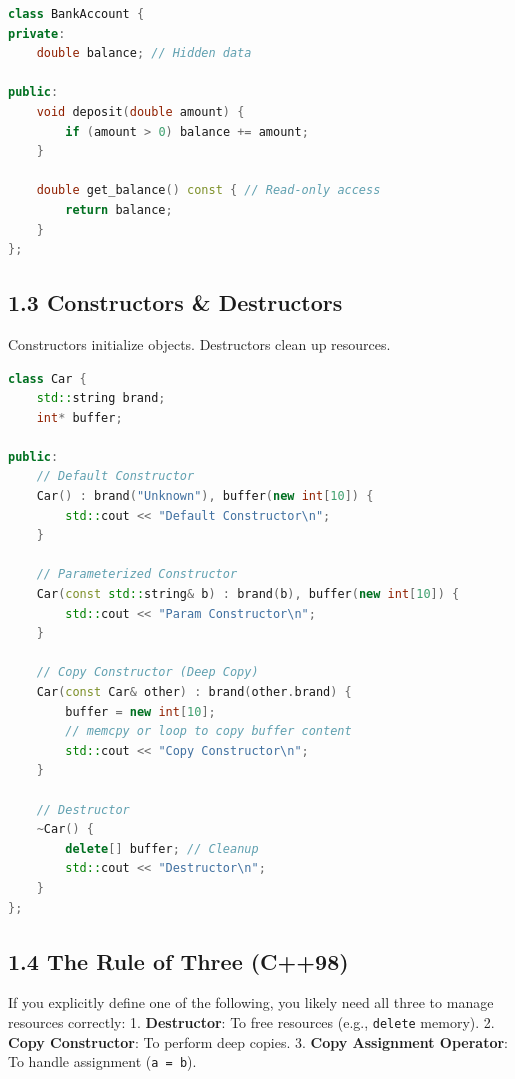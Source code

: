 \begin{lstlisting}[language={C++}]
class BankAccount {
private:
    double balance; // Hidden data

public:
    void deposit(double amount) {
        if (amount > 0) balance += amount;
    }
    
    double get_balance() const { // Read-only access
        return balance;
    }
};
\end{lstlisting}

\hypertarget{constructors-destructors}{%
\subsection{1.3 Constructors \&
Destructors}\label{constructors-destructors}}

Constructors initialize objects. Destructors clean up resources.

\begin{lstlisting}[language={C++}]
class Car {
    std::string brand;
    int* buffer;

public:
    // Default Constructor
    Car() : brand("Unknown"), buffer(new int[10]) {
        std::cout << "Default Constructor\n";
    }

    // Parameterized Constructor
    Car(const std::string& b) : brand(b), buffer(new int[10]) {
        std::cout << "Param Constructor\n";
    }

    // Copy Constructor (Deep Copy)
    Car(const Car& other) : brand(other.brand) {
        buffer = new int[10];
        // memcpy or loop to copy buffer content
        std::cout << "Copy Constructor\n";
    }

    // Destructor
    ~Car() {
        delete[] buffer; // Cleanup
        std::cout << "Destructor\n";
    }
};
\end{lstlisting}

\hypertarget{the-rule-of-three-c98}{%
\subsection{1.4 The Rule of Three (C++98)}\label{the-rule-of-three-c98}}

If you explicitly define one of the following, you likely need all three
to manage resources correctly: 1. \textbf{Destructor}: To free resources
(e.g., \passthrough{\lstinline!delete!} memory). 2. \textbf{Copy
Constructor}: To perform deep copies. 3. \textbf{Copy Assignment
Operator}: To handle assignment (\passthrough{\lstinline!a = b!}).

